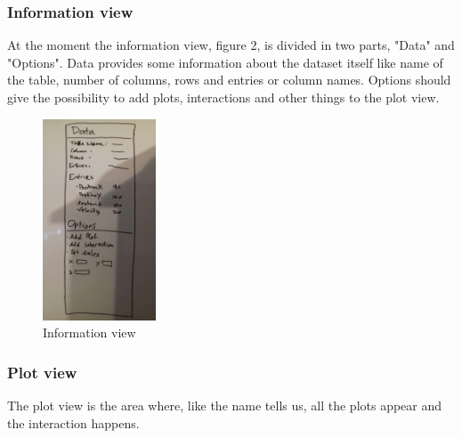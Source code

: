 \documentclass{article}
\begin{document}
\subsubsection{Information view}
At the moment the information view, figure 2, is divided in two parts, "Data" and "Options". Data provides some information about the dataset itself like name of the table, number of columns, rows and entries or column names. Options should give the possibility to add plots, interactions and other things to the plot view.
\begin{figure}[!h]
\centering
\includegraphics[width=0.3\textwidth]{InformationView.jpg}
	\caption{Information view}
	\label{fig2}
\end{figure}
\subsubsection{Plot view}
The plot view is the area where, like the name tells us, all the plots appear and the interaction happens.
\end{document}
